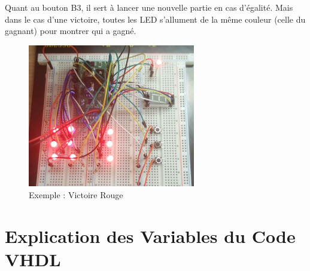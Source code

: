 \documentclass{article}
\begin{document}
Quant au bouton B3, il sert à lancer une nouvelle partie en cas d'égalité. Mais dans le cas d'une victoire, toutes les LED s'allument de la même couleur (celle du gagnant) pour montrer qui a gagné.

\begin{center}
\begin{figure}[h!]
    \centering
    \includegraphics[width=0.65\textwidth]{images/TTT4.PNG}
    \caption{Exemple : Victoire Rouge}
    \label{fig:my_label}
\end{figure}
\end{center}










\newpage










\section{Explication des Variables du Code VHDL}
\end{document}
